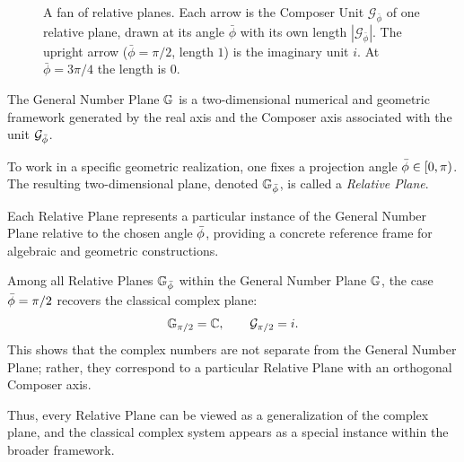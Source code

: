 \begin{figure}[tb]
\myfloatalign
{}
\caption[A fan of relative planes]{A fan of relative planes. Each arrow is the Composer Unit $\mathcal{G}_{\bar{\phi}}$ of one relative plane, drawn at its angle $\bar{\phi}$ with its own length $|\mathcal{G}_{\bar{\phi}}|$. The upright arrow ($\bar{\phi} = \pi/2$, length $1$) is the imaginary unit $i$. At $\bar{\phi} = 3\pi/4$ the length is $0$.}
\label{fig:fan}
\end{figure}

\begin{definition}\label{def:relative-plane}
The General Number Plane $\mathbb{G}$ is a two-dimensional numerical and geometric framework generated by the real axis and the Composer axis associated with the unit $\mathcal{G}_{\bar{\phi}}$.

To work in a specific geometric realization, one fixes a projection angle $\bar{\phi} \in [0, \pi)$. The resulting two-dimensional plane, denoted $\mathbb{G}_{\bar{\phi}}$, is called a \emph{Relative Plane}.

Each Relative Plane represents a particular instance of the General Number Plane relative to the chosen angle $\bar{\phi}$, providing a concrete reference frame for algebraic and geometric constructions.
\end{definition}

\begin{remark}\label{rem:complex-relative}
Among all Relative Planes $\mathbb{G}_{\bar{\phi}}$ within the General Number Plane $\mathbb{G}$, the case $\bar{\phi} = \pi/2$ recovers the classical complex plane:
\[
\mathbb{G}_{\pi/2} = \mathbb{C}, \qquad \mathcal{G}_{\pi/2} = i .
\]
This shows that the complex numbers are not separate from the General Number Plane; rather, they correspond to a particular Relative Plane with an orthogonal Composer axis.

Thus, every Relative Plane can be viewed as a generalization of the complex plane, and the classical complex system appears as a special instance within the broader framework.
\end{remark}

